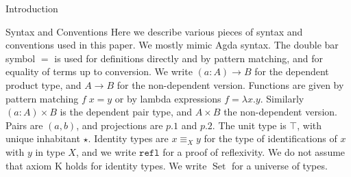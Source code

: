\documentclass[runningheads]{llncs}
\newcommand{\todo}[1]{\textcolor{red}{TODO: {#1}}}
\newcommand{\erase}[1]{{}}
\DeclareMathOperator{\USet}{Set}
\DeclareMathOperator{\UU}{U}
\newcommand{\IdA}[3]{{#1}\equiv_{#3}{#2}}
\newcommand{\refl}{\texttt{refl}}
\begin{document}
\begin{section}{Introduction}
\erase{\todo{work on this} While Agda supports inductive-inductive types natively \citep{nordvallforsbergSetzer2010inductiveinductive}, Coq 8.8 does not. Constructing inductive-inductive types out of simpler types allows for a simpler core type theory without sacrificing expressiveness.}

\end{section}

\begin{section}{Syntax and Conventions}
    Here we describe various pieces of syntax and conventions used in this paper. We mostly mimic Agda syntax. The double bar symbol $=$ is used for definitions directly and by pattern matching, and for equality of terms up to conversion. We write $(a : A) \to B$ for the dependent product type, and $A \to B$ for the non-dependent version. Functions are given by pattern matching $f\; x = y$ or by lambda expressions $f = \lambda x.y$. Similarly $(a : A) \times B$ is the dependent pair type, and $A \times B$ the non-dependent version. Pairs are $(a, b)$, and projections are $p.1$ and $p.2$. The unit type is $\top$, with unique inhabitant $\star$. Identity types are $\IdA{x}{y}{X}$ for the type of identifications of $x$ with $y$ in type $X$, and we write $\refl$ for a proof of reflexivity. We do not assume that axiom K holds for identity types.\erase{ We often use left-nested dependent pair types, or tuples $(\star : \top) \times (a : A) \times (b : B) \times C$. We will use $\langle a, b, c\rangle$ as a shorthand for $(((\star, a), b), c)$, and if there are names associated with the components, such as $A$, $B$, and $C$ above, we may use $\langle p.A, p.B, p.C\rangle$ for the projections.} We write $\USet$ for a universe of types.
    
    \erase{ In section \ref{IIspecs-definition}, we define a syntactic extension of type theory, to write specifications of inductive-inductive types. There we use $\Pi$ to suggest dependent function types, $\Sigma$ to suggest dependent pair types, and $\UU$ to suggest a universe. However, these symbols will only be used in syntax for inductive-inductive specifications, and not to denote types. We reuse $\top$ and $\star$, as well as notations for lambda and pairing, letting context disambiguate. }
    

\end{section}
\end{document}
